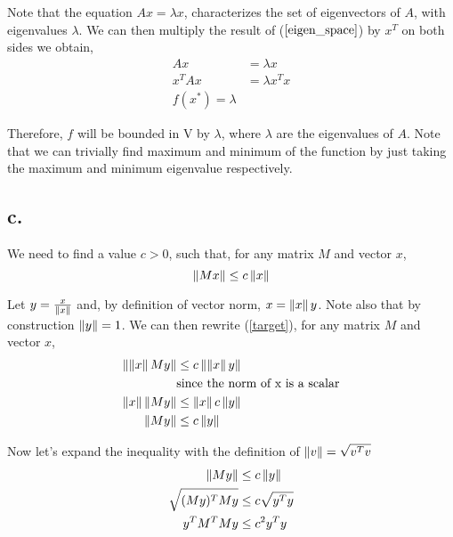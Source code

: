 \begin{homeworkProblem}
Note that the equation $Ax = \lambda x$, characterizes the set of eigenvectors of $A$, with eigenvalues $\lambda$. We can then multiply the result of ($\ref{eigen_space}$) by $x^T$ on both sides we obtain,
\begin{equation} \label{res_eigen}
    \begin{split}
        Ax & = \lambda x \\
        x^T Ax & = \lambda x^T x \\
        f(x^*) = \lambda
    \end{split}
\end{equation}

Therefore, $f$ will be bounded in V by $\lambda$, where $\lambda$ are the eigenvalues of $A$. Note that we can trivially find maximum and minimum of the function by just taking the maximum and minimum eigenvalue respectively.

\subsection{c.}
We need to find a value $c > 0$, such that, for any matrix $M$ and vector $x$,
\begin{equation} \label{target}
    \left\lVert Mx\right\rVert \leq c \left\lVert x\right\rVert
\end{equation}

Let $y =\frac{x}{\left\lVert x\right\rVert}$ and, by definition of vector norm, $x = \left\lVert x\right\rVert y$. Note also that by construction $\left\lVert y\right\rVert=1$. We can then rewrite (\ref{target}), for any matrix $M$ and vector $x$,
\begin{equation}
\begin{split}
    \left\lVert\left\lVert x\right\rVert My\right\rVert &\leq c \left\lVert\left\lVert x\right\rVert y\right\rVert \\
    & \text{since the norm of x is a scalar} \\
    \left\lVert x\right\rVert \left\lVert My\right\rVert & \leq \left\lVert x\right\rVert c \left\lVert y\right\rVert \\
    \left\lVert My\right\rVert & \leq c \left\lVert y\right\rVert
\end{split}
\end{equation}

Now let's expand the inequality with the definition of $\left\lVert v\right\rVert = \sqrt{v^T v}$
\begin{equation}
    \begin{split}
        \left\lVert My\right\rVert & \leq c \left\lVert y\right\rVert \\
        \sqrt{(My)^T My} & \leq c \sqrt{y^T y} \\
        y^T M^T M y & \leq c^2 y^T y
    \end{split}
\end{equation}


\end{homeworkProblem}
